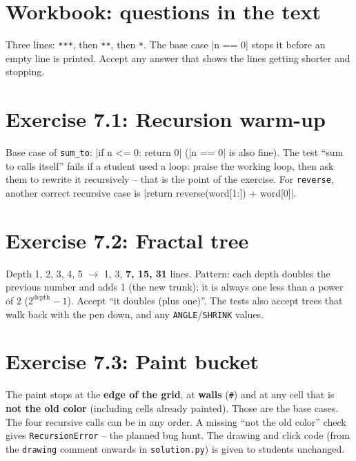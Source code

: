 
\section{Workbook: questions in the text}
\begin{answer}
Three lines: \texttt{***}, then \texttt{**}, then \texttt{*}. The base case \py|n == 0| stops it before an empty line is printed. Accept any answer that shows the lines getting shorter and stopping.
\end{answer}

\section{Exercise 7.1: Recursion warm-up}
\begin{answer}
Base case of \texttt{sum\_to}: \py|if n <= 0: return 0| (\py|n == 0| is also fine). The test \enquote{sum to calls itself} fails if a student used a loop: praise the working loop, then ask them to rewrite it recursively -- that is the point of the exercise. For \texttt{reverse}, another correct recursive case is \py|return reverse(word[1:]) + word[0]|.
\end{answer}

\section{Exercise 7.2: Fractal tree}
\begin{answer}
Depth 1, 2, 3, 4, 5 $\rightarrow$ 1, 3, \textbf{7, 15, 31} lines. Pattern: each depth doubles the previous number and adds 1 (the new trunk); it is always one less than a power of 2 ($2^{\text{depth}} - 1$). Accept \enquote{it doubles (plus one)}. The tests also accept trees that walk back with the pen down, and any \texttt{ANGLE}/\texttt{SHRINK} values.
\end{answer}

\section{Exercise 7.3: Paint bucket}
\begin{answer}
The paint stops at the \textbf{edge of the grid}, at \textbf{walls} (\texttt{\#}) and at any cell that is \textbf{not the old color} (including cells already painted). Those are the base cases. The four recursive calls can be in any order. A missing \enquote{not the old color} check gives \texttt{RecursionError} -- the planned bug hunt. The drawing and click code (from the \texttt{drawing} comment onwards in \texttt{solution.py}) is given to students unchanged.
\end{answer}

